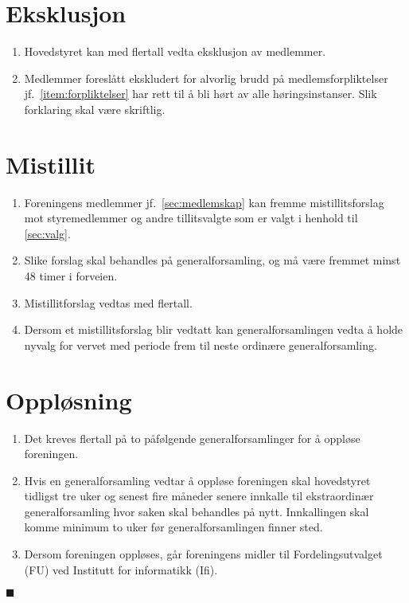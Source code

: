 \documentclass[8pt,norsk,a4paper]{article}
\begin{document}
\section{Eksklusjon}
\begin{enumerate}
	\item Hovedstyret kan med  flertall vedta eksklusjon av medlemmer.
	\item Medlemmer foreslått ekskludert for alvorlig brudd på medlemsforpliktelser jf.~\ref{item:forpliktelser} har rett til å bli hørt av alle høringsinstanser. Slik forklaring skal være skriftlig.
\end{enumerate}

\section{Mistillit}\label{sec:mistillit}
\begin{enumerate}
	\item{Foreningens medlemmer jf.~\ref{sec:medlemskap} kan fremme mistillitsforslag mot styremedlemmer og andre tillitsvalgte som er valgt i henhold til \ref{sec:valg}.}
	\item{Slike forslag skal behandles på generalforsamling, og må være fremmet minst 48 timer i forveien.}
	\item{Mistillitforslag vedtas med  flertall.}
	\item{Dersom et mistillitsforslag blir vedtatt kan generalforsamlingen vedta å holde nyvalg for vervet med periode frem til neste ordinære generalforsamling.}
\end{enumerate}

\section{Oppløsning}\label{sec:opplosning}
\begin{enumerate}
        \item{Det kreves  flertall på to påfølgende generalforsamlinger for å oppløse foreningen.}
        \item{Hvis en generalforsamling vedtar å oppløse foreningen skal hovedstyret tidligst tre uker og senest fire måneder senere innkalle til ekstraordinær generalforsamling hvor saken skal behandles på nytt. Innkallingen skal komme minimum to uker før generalforsamlingen finner sted.}
        \item{Dersom foreningen oppløses, går foreningens midler til Fordelingsutvalget (FU) ved Institutt for informatikk (Ifi).}
\end{enumerate}
$\blacksquare$
\end{document}
